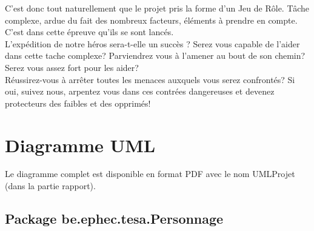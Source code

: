 \documentclass[a4paper,titlepage]{article}
\begin{document}
	C’est donc tout naturellement que le projet pris la forme d’un Jeu de Rôle. Tâche complexe, ardue du fait des nombreux facteurs, éléments à prendre en compte. C’est dans cette épreuve qu’ils se sont lancés.\\

	L’expédition de notre héros sera-t-elle un succès ? Serez vous capable de l’aider dans cette tache complexe? Parviendrez vous à l’amener au bout de son chemin? Serez vous assez fort pour les aider?\\
	
Réussirez-vous à arrêter toutes les menaces auxquels vous serez confrontés?
Si oui, suivez nous, arpentez vous dans ces contrées dangereuses et devenez protecteurs des faibles et des opprimés!

	
	\clearpage
	\section{Diagramme UML}
	Le diagramme complet est disponible en format PDF avec le nom UMLProjet (dans la partie rapport).
	\subsection{Package \og be.ephec.tesa.Personnage \fg{}  }	
	
\end{document}
